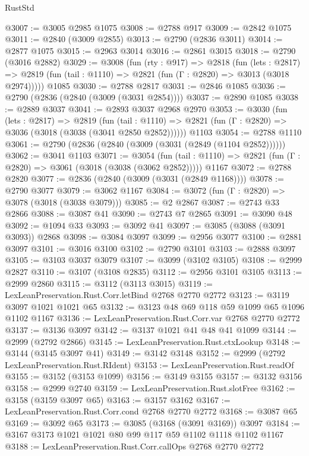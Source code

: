 \begin{lexlean}{RustStd}
\begin{coremodule}
@3007 := @3005 @2985 @1075
@3008 := @2788 @917
@3009 := @2842 @1075
@3011 := @2840 (@3009 @2855)
@3013 := @2790 (@2836 @3011)
@3014 := @2877 @1075
@3015 := @2963 @3014
@3016 := @2861 @3015
@3018 := @2790 (@3016 @2882)
@3029 := @3008
    (fun (rty : @917) =>
    @2818
      (fun (lets : @2817) =>
      @2819 (fun (tail : @1110) => @2821 (fun (Γ : @2820) => @3013 (@3018 @2974)))))
    @1085
@3030 := @2788 @2817
@3031 := @2846 @1085
@3036 := @2790 (@2836 (@2840 (@3009 (@3031 @2854))))
@3037 := @2890 @1085
@3038 := @2889 @3037
@3041 := @2893 @3037 @2968 @2970
@3053 := @3030
    (fun (lets : @2817) =>
    @2819
      (fun (tail : @1110) => @2821 (fun (Γ : @2820) => @3036 (@3018 (@3038 (@3041 @2850 @2852))))))
    @1103
@3054 := @2788 @1110
@3061 := @2790 (@2836 (@2840 (@3009 (@3031 (@2849 (@1104 @2852))))))
@3062 := @3041 @1103
@3071 := @3054
    (fun (tail : @1110) => @2821 (fun (Γ : @2820) => @3061 (@3018 (@3038 (@3062 @2852)))))
    @1167
@3072 := @2788 @2820
@3077 := @2836 (@2840 (@3009 (@3031 (@2849 @1168))))
@3078 := @2790 @3077
@3079 := @3062 @1167
@3084 := @3072 (fun (Γ : @2820) => @3078 (@3018 (@3038 @3079)))
@3085 := @2 @2867
@3087 := @2743 @33 @2866
@3088 := @3087 @41
@3090 := @2743 @7 @2865
@3091 := @3090 @48
@3092 := @1094 @33
@3093 := @3092 @41
@3097 := @3085 (@3088 (@3091 @3093)) @2868
@3098 := @3084 @3097
@3099 := @2956 @3077
@3100 := @2881 @3097
@3101 := @3016 @3100
@3102 := @2790 @3101
@3103 := @2888 @3097
@3105 := @3103 @3037 @3079
@3107 := @3099 (@3102 @3105)
@3108 := @2999 @2827
@3110 := @3107 (@3108 @2835)
@3112 := @2956 @3101 @3105
@3113 := @2999 @2860
@3115 := @3112 (@3113 @3015)
@3119 := LexLeanPreservation.Rust.Corr.letBind @2768 @2770 @2772
@3123 := @3119 @3097 @1021 @1021 @65
@3132 := @3123 @48 @69 @118 @59 @1099 @65 @1096 @1102 @1167
@3136 := LexLeanPreservation.Rust.Corr.var @2768 @2770 @2772
@3137 := @3136 @3097
@3142 := @3137 @1021 @41 @48 @41 @1099
@3144 := @2999 (@2792 @2866)
@3145 := LexLeanPreservation.Rust.ctxLookup
@3148 := @3144 (@3145 @3097 @41)
@3149 := @3142 @3148
@3152 := @2999 (@2792 LexLeanPreservation.Rust.RIdent)
@3153 := LexLeanPreservation.Rust.readOf
@3155 := @3152 (@3153 @1099)
@3156 := @3149 @3155
@3157 := @3132 @3156
@3158 := @2999 @2740
@3159 := LexLeanPreservation.Rust.slotFree
@3162 := @3158 (@3159 @3097 @65)
@3163 := @3157 @3162
@3167 := LexLeanPreservation.Rust.Corr.cond @2768 @2770 @2772
@3168 := @3087 @65
@3169 := @3092 @65
@3173 := @3085 (@3168 (@3091 @3169)) @3097
@3184 := @3167 @3173 @1021 @1021 @80 @99 @117 @59 @1102 @1118 @1102 @1167
@3188 := LexLeanPreservation.Rust.Corr.callOps @2768 @2770 @2772

\end{coremodule}
\end{lexlean}
